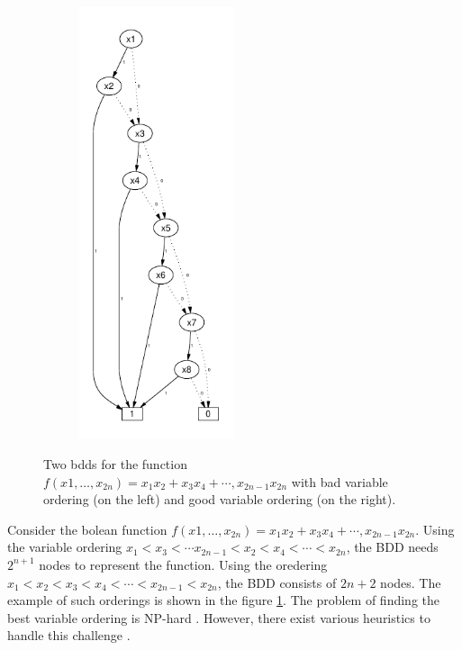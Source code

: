 \documentclass[pdflatex,sn-mathphys-num]{sn-jnl}%
\theoremstyle{thmstyleone}%
\theoremstyle{thmstyletwo}%
\theoremstyle{thmstylethree}%
\begin{document}
\begin{figure}[H]
\begin{subfigure}{0.3\textwidth}
                \includegraphics[width=0.5\textwidth]{Figures/BDD_Variable_Ordering_Good.pdf}
            \end{subfigure}
            \caption{Two bdds for the function $f(x1,\dots, x_{2n}) = x_1x_2 + x_3x_4 + \cdots, x_{2n-1}x_{2n}$ with bad variable ordering (on the left) and good variable ordering (on the right).}
            \label{figure::ordering}
        \end{figure}

        Consider the bolean function $f(x1,\dots, x_{2n}) = x_1x_2 + x_3x_4 + \cdots, x_{2n-1}x_{2n}$. Using the variable ordering $x_1 < x_3 < \cdots x_{2n-1} < x_2 < x_4 < \cdots < x_{2n}$, the BDD needs $2^{n+1}$ nodes to represent the function. Using the oredering $x_1 < x_2 < x_3 < x_4 < \cdots < x_{2n-1} < x_{2n}$, the BDD consists of $2n + 2$ nodes. The example of such orderings is shown in the figure \ref{figure::ordering}. The problem of finding the best variable ordering is NP-hard \cite{BDD_np-hard}. However, there exist various heuristics to handle this challenge \cite{BDD_heuristics}.
\end{document}
